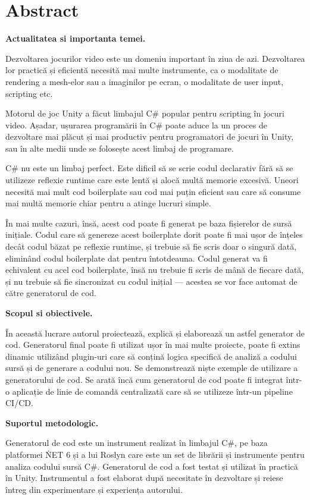 \documentclass{report}
\begin{document}
\chapter*{Abstract}

\textbf{Actualitatea si importanta temei.}

Dezvoltarea jocurilor video este un domeniu important în ziua de azi.
Dezvoltarea lor practică și eficientă necesită mai multe instrumente, ca o modalitate de rendering a mesh-elor sau a imaginilor pe ecran, o modalitate de user input, scripting etc.

Motorul de joc Unity a făcut limbajul C\# popular pentru scripting în jocuri video.
Așadar, ușurarea programării în C\# poate aduce la un proces de dezvoltare mai plăcut și mai productiv pentru programatori de jocuri în Unity, sau în alte medii unde se folosește acest limbaj de programare.

C\# nu este un limbaj perfect.
Este dificil să se scrie codul declarativ fără să se utilizeze reflexie runtime care este lentă și alocă multă memorie excesivă.
Uneori necesită mai mult cod boilerplate sau cod mai puțin eficient sau care să consume mai multă memorie chiar pentru a atinge lucruri simple.

În mai multe cazuri, însă, acest cod poate fi generat pe baza fișierelor de sursă inițiale.
Codul care să genereze acest boilerplate dorit poate fi mai ușor de înțeles decât codul băzat pe reflexie runtime, și trebuie să fie scris doar o singură dată, eliminând codul boilerplate dat pentru întotdeauna.
Codul generat va fi echivalent cu acel cod boilerplate, însă nu trebuie fi scris de mână de fiecare dată, și nu trebuie să fie sincronizat cu codul inițial — acestea se vor face automat de către generatorul de cod.


\textbf{Scopul si obiectivele.}

În această lucrare autorul proiectează, explică și elaborează un astfel generator de cod.
Generatorul final poate fi utilizat ușor în mai multe proiecte, poate fi extins dinamic utilizând plugin-uri care să conțină logica specifică de analiză a codului sursă și de generare a codului nou.
Se demonstrează niște exemple de utilizare a generatorului de cod.
Se arată încă cum generatorul de cod poate fi integrat într-o aplicație de linie de comandă centralizată care să se utilizeze într-un pipeline CI/CD.

\textbf{Suportul metodologic.}

Generatorul de cod este un instrument realizat în limbajul C\#, pe baza platformei \. NET 6 și a lui Roslyn care este un set de librării și instrumente pentru analiza codului sursă C\#.
Generatorul de cod a fost testat și utilizat în practică în Unity.
Instrumentul a fost elaborat după necesitate în dezvoltare și reiese întreg din experimentare și experiența autorului.
\end{document}
